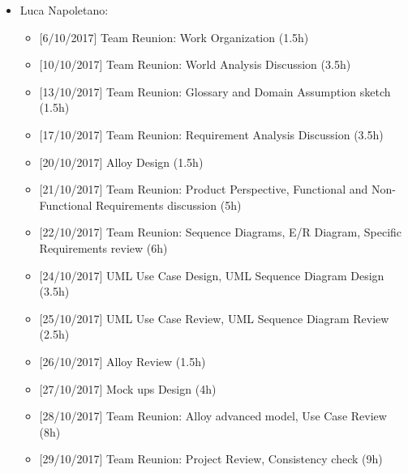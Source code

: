 \begin{itemize}
   \item Luca Napoletano:
      \begin{itemize}
      \item {[}6/10/2017{]} Team Reunion: Work Organization (1.5h)
      \item {[}10/10/2017{]} Team Reunion: World Analysis Discussion (3.5h)
      \item {[}13/10/2017{]} Team Reunion: Glossary and Domain Assumption sketch (1.5h)
      \item {[}17/10/2017{]} Team Reunion: Requirement Analysis Discussion (3.5h)
      \item {[}20/10/2017{]} Alloy Design (1.5h)
      \item {[}21/10/2017{]} Team Reunion: Product Perspective, Functional and Non-Functional Requirements discussion (5h)
      \item {[}22/10/2017{]} Team Reunion: Sequence Diagrams, E/R Diagram, Specific Requirements review (6h)
      \item {[}24/10/2017{]} UML Use Case Design, UML Sequence Diagram Design (3.5h)
      \item {[}25/10/2017{]} UML Use Case Review, UML Sequence Diagram Review (2.5h)
      \item {[}26/10/2017{]} Alloy Review (1.5h)
      \item {[}27/10/2017{]} Mock ups Design (4h)
      \item {[}28/10/2017{]} Team Reunion: Alloy advanced model, Use Case Review (8h) 
      \item {[}29/10/2017{]} Team Reunion: Project Review, Consistency check (9h)
      \end{itemize}
      
      
\end{itemize}
\newpage



